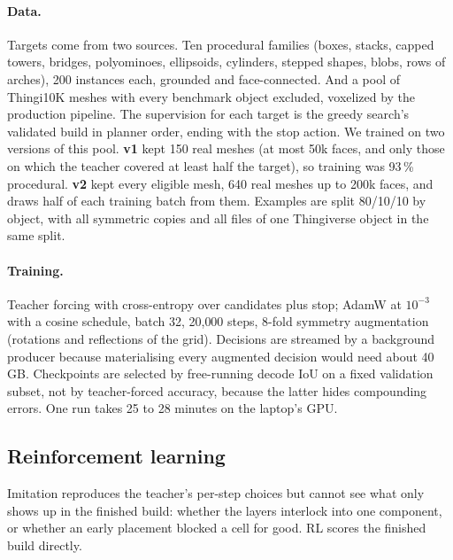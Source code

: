 \paragraph{Data.} Targets come from two sources. Ten procedural families (boxes, stacks, capped towers, bridges,
polyominoes, ellipsoids, cylinders, stepped shapes, blobs, rows of arches), 200 instances each, grounded and
face-connected. And a pool of Thingi10K meshes with every benchmark object excluded, voxelized by the production
pipeline. The supervision for each target is the greedy search's validated build in planner order, ending with the
stop action. We trained on two versions of this pool. \textbf{v1} kept 150 real meshes (at most 50k faces, and only
those on which the teacher covered at least half the target), so training was 93\,\% procedural. \textbf{v2} kept
every eligible mesh, 640 real meshes up to 200k faces, and draws half of each training batch from them. Examples
are split 80/10/10 by object, with all symmetric copies and all files of one Thingiverse object in the same split.

\paragraph{Training.} Teacher forcing with cross-entropy over candidates plus stop; AdamW at $10^{-3}$ with a cosine
schedule, batch 32, 20{,}000 steps, 8-fold symmetry augmentation (rotations and reflections of the grid). Decisions
are streamed by a background producer because materialising every augmented decision would need about 40\,GB.
Checkpoints are selected by free-running decode IoU on a fixed validation subset, not by teacher-forced accuracy,
because the latter hides compounding errors. One run takes 25 to 28 minutes on the laptop's GPU.

\subsection{Reinforcement learning}
Imitation reproduces the teacher's per-step choices but cannot see what only shows up in the finished build: whether
the layers interlock into one component, or whether an early placement blocked a cell for good. RL scores the
finished build directly.

